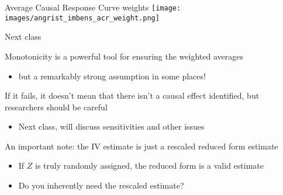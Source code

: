 \documentclass[notes,11pt, aspectratio=169]{beamer}
\newenvironment{wideitemize}{\itemize\addtolength{\itemsep}{10pt}}{\enditemize}
\begin{document}
\begin{frame}{Average Causal Response Curve weights}
 \texttt{[image: images/angrist\_imbens\_acr\_weight.png]}
\end{frame}

\begin{frame}{Next class}
  \begin{wideitemize}
  \item   Monotonicity is a powerful tool for ensuring the weighted averages
    \begin{itemize}
    \item   but a remarkably strong assumption in some places!
    \end{itemize}
  \item If it fails, it doesn't mean that there isn't a causal effect
    identified, but researchers should be careful
    \begin{itemize}
    \item Next class, will discuss sensitivities and other issues
    \end{itemize}
  \item An important note: the IV estimate is just a rescaled reduced
    form estimate
    \begin{itemize}
    \item If $Z$ is truly randomly assigned, the reduced form is a valid estimate
      \item Do you inherently need the rescaled estimate? 
    \end{itemize}
  \end{wideitemize}
\end{frame}
\end{document}
